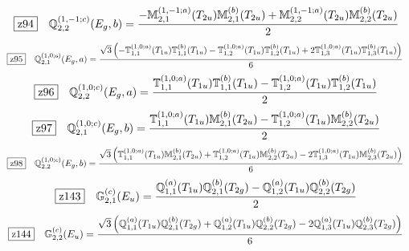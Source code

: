\documentclass[fleqn,10pt,landscape]{jsarticle}
\begin{document}
\begin{dmath*}
\hspace*{3mm}\fbox{z94}\quad \mathbb{Q}_{2,2}^{(1,-1;c)}(E_{g},b)=\frac{- \mathbb{M}_{2,1}^{(1,-1;a)}(T_{2u}) \mathbb{M}_{2,1}^{(b)}(T_{2u}) + \mathbb{M}_{2,2}^{(1,-1;a)}(T_{2u}) \mathbb{M}_{2,2}^{(b)}(T_{2u})}{2}
\end{dmath*}
\begin{dmath*}
\hspace*{3mm}\fbox{z95}\quad \mathbb{Q}_{2,1}^{(1,0;c)}(E_{g},a)=\frac{\sqrt{3} \left(- \mathbb{T}_{1,1}^{(1,0;a)}(T_{1u}) \mathbb{T}_{1,1}^{(b)}(T_{1u}) - \mathbb{T}_{1,2}^{(1,0;a)}(T_{1u}) \mathbb{T}_{1,2}^{(b)}(T_{1u}) + 2 \mathbb{T}_{1,3}^{(1,0;a)}(T_{1u}) \mathbb{T}_{1,3}^{(b)}(T_{1u})\right)}{6}
\end{dmath*}
\begin{dmath*}
\hspace*{3mm}\fbox{z96}\quad \mathbb{Q}_{2,2}^{(1,0;c)}(E_{g},a)=\frac{\mathbb{T}_{1,1}^{(1,0;a)}(T_{1u}) \mathbb{T}_{1,1}^{(b)}(T_{1u}) - \mathbb{T}_{1,2}^{(1,0;a)}(T_{1u}) \mathbb{T}_{1,2}^{(b)}(T_{1u})}{2}
\end{dmath*}
\begin{dmath*}
\hspace*{3mm}\fbox{z97}\quad \mathbb{Q}_{2,1}^{(1,0;c)}(E_{g},b)=\frac{\mathbb{T}_{1,1}^{(1,0;a)}(T_{1u}) \mathbb{M}_{2,1}^{(b)}(T_{2u}) - \mathbb{T}_{1,2}^{(1,0;a)}(T_{1u}) \mathbb{M}_{2,2}^{(b)}(T_{2u})}{2}
\end{dmath*}
\begin{dmath*}
\hspace*{3mm}\fbox{z98}\quad \mathbb{Q}_{2,2}^{(1,0;c)}(E_{g},b)=\frac{\sqrt{3} \left(\mathbb{T}_{1,1}^{(1,0;a)}(T_{1u}) \mathbb{M}_{2,1}^{(b)}(T_{2u}) + \mathbb{T}_{1,2}^{(1,0;a)}(T_{1u}) \mathbb{M}_{2,2}^{(b)}(T_{2u}) - 2 \mathbb{T}_{1,3}^{(1,0;a)}(T_{1u}) \mathbb{M}_{2,3}^{(b)}(T_{2u})\right)}{6}
\end{dmath*}
\begin{dmath*}
\hspace*{3mm}\fbox{z143}\quad \mathbb{G}_{2,1}^{(c)}(E_{u})=\frac{\mathbb{Q}_{1,1}^{(a)}(T_{1u}) \mathbb{Q}_{2,1}^{(b)}(T_{2g}) - \mathbb{Q}_{1,2}^{(a)}(T_{1u}) \mathbb{Q}_{2,2}^{(b)}(T_{2g})}{2}
\end{dmath*}
\begin{dmath*}
\hspace*{3mm}\fbox{z144}\quad \mathbb{G}_{2,2}^{(c)}(E_{u})=\frac{\sqrt{3} \left(\mathbb{Q}_{1,1}^{(a)}(T_{1u}) \mathbb{Q}_{2,1}^{(b)}(T_{2g}) + \mathbb{Q}_{1,2}^{(a)}(T_{1u}) \mathbb{Q}_{2,2}^{(b)}(T_{2g}) - 2 \mathbb{Q}_{1,3}^{(a)}(T_{1u}) \mathbb{Q}_{2,3}^{(b)}(T_{2g})\right)}{6}
\end{dmath*}
\end{document}
